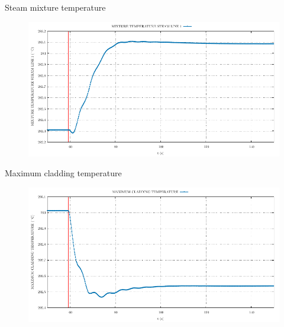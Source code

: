 \begin{frame}{Steam mixture temperature}
	\begin{figure}
		\centering
		\includegraphics[width=\textwidth]{./graphs/MIXTURE TEMPERATURE STEAM LINE 1_comp.pdf}
		
	\end{figure}
	
\end{frame}
\begin{frame}{Maximum cladding temperature}
	\begin{figure}
		\centering
		\includegraphics[width=\textwidth]{./graphs/MAXIMUM CLADDING TEMPERATURE_comp.pdf}
		
	\end{figure}
	
\end{frame}
%		
%	

